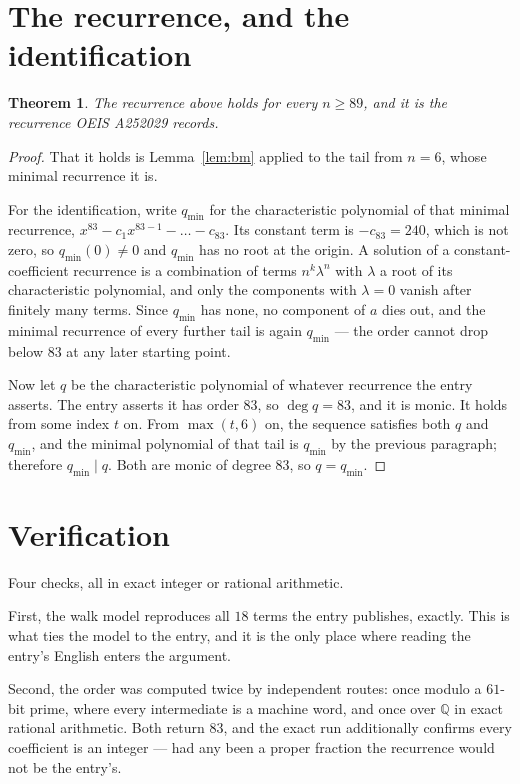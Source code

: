 \documentclass[11pt,a4paper]{article}
\theoremstyle{plain}
\newtheorem{theorem}{Theorem}
\theoremstyle{definition}
\begin{document}
\section{The recurrence, and the identification}

\begin{theorem}
The recurrence above holds for every $n\ge89$, and it is the recurrence OEIS A252029 records.
\end{theorem}

\begin{proof}
That it holds is Lemma~\ref{lem:bm} applied to the tail from $n=6$, whose minimal
recurrence it is.

For the identification, write $q_{\min}$ for the characteristic polynomial of that minimal
recurrence, $x^{83}-c_1x^{83-1}-\dots-c_{83}$. Its constant term is
$-c_{83}=240$, which is not zero, so $q_{\min}(0)\neq0$ and $q_{\min}$ has no
root at the origin. A solution of a constant-coefficient recurrence is a combination of terms
$n^{k}\lambda^{n}$ with $\lambda$ a root of its characteristic polynomial, and only the
components with $\lambda=0$ vanish after finitely many terms. Since $q_{\min}$ has none, no
component of $a$ dies out, and the minimal recurrence of every further tail is again
$q_{\min}$ --- the order cannot drop below $83$ at any later starting point.

Now let $q$ be the characteristic polynomial of whatever recurrence the entry asserts. The
entry asserts it has order $83$, so $\deg q=83$, and it is monic. It holds from some
index $t$ on. From $\max(t,6)$ on, the sequence satisfies both $q$ and $q_{\min}$, and
the minimal polynomial of that tail is $q_{\min}$ by the previous paragraph; therefore
$q_{\min}\mid q$. Both are monic of degree $83$, so $q=q_{\min}$.
\end{proof}

\section{Verification}

Four checks, all in exact integer or rational arithmetic.

First, the walk model reproduces all $18$ terms the entry publishes, exactly. This is
what ties the model to the entry, and it is the only place where reading the entry's English
enters the argument.

Second, the order was computed twice by independent routes: once modulo a $61$-bit prime, where
every intermediate is a machine word, and once over $\mathbb{Q}$ in exact rational arithmetic.
Both return $83$, and the exact run additionally confirms every coefficient is an integer
--- had any been a proper fraction the recurrence would not be the entry's.
\end{document}
